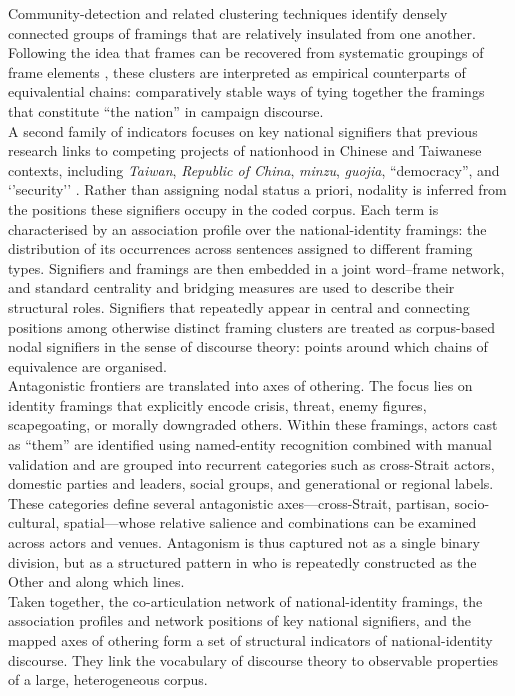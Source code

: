 \documentclass[man,12pt]{apa7}
\begin{document}
Community-detection and related clustering techniques identify densely connected groups of framings that are relatively insulated from one another. 
Following the idea that frames can be recovered from systematic groupings of frame elements \parencite{matthes2008}, these clusters are interpreted as empirical counterparts of equivalential chains: 
comparatively stable ways of tying together the framings that constitute ``the nation'' in campaign discourse.\\%
A second family of indicators focuses on key national signifiers that previous research links to competing projects of nationhood in Chinese and Taiwanese contexts, 
including \emph{Taiwan}, \emph{Republic of China}, \emph{minzu}, \emph{guojia}, ``democracy'', and `'security'' \parencite{cao2021,wu2007,zhao2000}. 
Rather than assigning nodal status a priori, nodality is inferred from the positions these signifiers occupy in the coded corpus. 
Each term is characterised by an association profile over the national-identity framings: the distribution of its occurrences across sentences assigned to different framing types. 
Signifiers and framings are then embedded in a joint word--frame network, and standard centrality and bridging measures are used to describe their structural roles. 
Signifiers that repeatedly appear in central and connecting positions among otherwise distinct framing clusters are treated as corpus-based nodal signifiers in the sense of discourse theory: 
points around which chains of equivalence are organised.\\%
Antagonistic frontiers are translated into axes of othering. 
The focus lies on identity framings that explicitly encode crisis, threat, enemy figures, scapegoating, or morally downgraded others. 
Within these framings, actors cast as ``them'' are identified using named-entity recognition combined with manual validation and are grouped into recurrent categories such as cross-Strait actors, domestic parties and leaders, social groups, and generational or regional labels. 
These categories define several antagonistic axes—cross-Strait, partisan, socio-cultural, spatial—whose relative salience and combinations can be examined across actors and venues. 
Antagonism is thus captured not as a single binary division, but as a structured pattern in who is repeatedly constructed as the Other and along which lines.\\%
Taken together, the co-articulation network of national-identity framings, the association profiles and network positions of key national signifiers, and the mapped axes of othering form a set of structural indicators of national-identity discourse. 
They link the vocabulary of discourse theory to observable properties of a large, heterogeneous corpus.\\%
\end{document}
